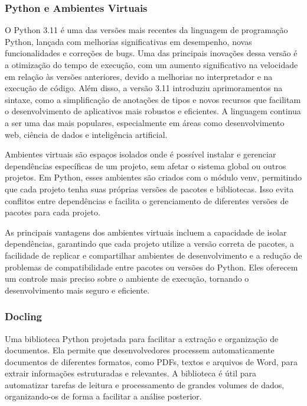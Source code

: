 \documentclass[a4paper, 12pt]{article}
\begin{document}
    \subsubsection{Python e Ambientes Virtuais}
    
    O Python 3.11 é uma das versões mais recentes da linguagem de programação Python, lançada com melhorias significativas em desempenho, novas funcionalidades e correções de bugs. Uma das principais inovações dessa versão é a otimização do tempo de execução, com um aumento significativo na velocidade em relação às versões anteriores, devido a melhorias no interpretador e na execução de código. Além disso, a versão 3.11 introduziu aprimoramentos na sintaxe, como a simplificação de anotações de tipos e novos recursos que facilitam o desenvolvimento de aplicativos mais robustos e eficientes. A linguagem continua a ser uma das mais populares, especialmente em áreas como desenvolvimento web, ciência de dados e inteligência artificial.
    
    Ambientes virtuais são espaços isolados onde é possível instalar e gerenciar dependências específicas de um projeto, sem afetar o sistema global ou outros projetos. Em Python, esses ambientes são criados com o módulo venv, permitindo que cada projeto tenha suas próprias versões de pacotes e bibliotecas. Isso evita conflitos entre dependências e facilita o gerenciamento de diferentes versões de pacotes para cada projeto.

    As principais vantagens dos ambientes virtuais incluem a capacidade de isolar dependências, garantindo que cada projeto utilize a versão correta de pacotes, a facilidade de replicar e compartilhar ambientes de desenvolvimento e a redução de problemas de compatibilidade entre pacotes ou versões do Python. Eles oferecem um controle mais preciso sobre o ambiente de execução, tornando o desenvolvimento mais seguro e eficiente.

    \subsubsection{Docling}
    Uma biblioteca Python projetada para facilitar a extração e organização de documentos. Ela permite que desenvolvedores processem automaticamente documentos de diferentes formatos, como PDFs, textos e arquivos de Word, para extrair informações estruturadas e relevantes. A biblioteca é útil para automatizar tarefas de leitura e processamento de grandes volumes de dados, organizando-os de forma a facilitar a análise posterior.
\end{document}
